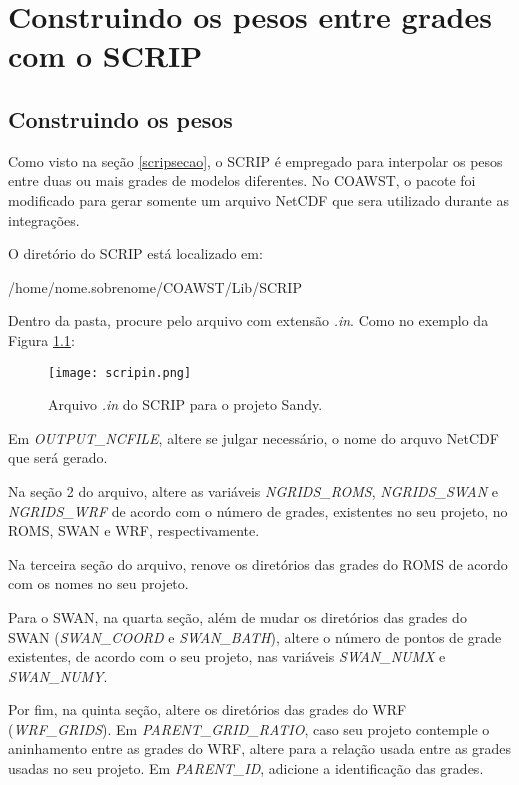 \chapter{Construindo os pesos entre grades com o SCRIP}

\section{Construindo os pesos}
\noindent Como visto na seção \textcolor{bleu_cite}{\ref{scripsecao}}, o SCRIP é empregado para interpolar os pesos entre duas ou mais grades de modelos diferentes. No COAWST, o pacote foi modificado para gerar somente um arquivo NetCDF que sera utilizado durante as integrações.
\bigskip

\noindent O diretório do SCRIP está localizado em:
\bigskip

\begin{bashcode}
/home/nome.sobrenome/COAWST/Lib/SCRIP
\end{bashcode}
\bigskip

\noindent Dentro da pasta, procure pelo arquivo com extensão \textit{.in}. Como no exemplo da Figura \textcolor{bleu_cite}{\ref{scripinnedit}}:

\begin{figure}[H]
    \centering
    \texttt{[image: scripin.png]}
    \caption{Arquivo \textit{.in} do SCRIP para o projeto Sandy.}
    \label{scripinnedit}
\end{figure}
\bigskip

\noindent Em \textit{OUTPUT\_NCFILE}, altere se julgar necessário, o nome do arquvo NetCDF que será gerado.
\bigskip

\noindent Na seção 2 do arquivo, altere as variáveis \textit{NGRIDS\_ROMS}, \textit{NGRIDS\_SWAN} e \textit{NGRIDS\_WRF} de acordo com o número de grades, existentes no seu projeto, no ROMS, SWAN e WRF, respectivamente.
\bigskip

\noindent Na terceira seção do arquivo, renove os diretórios das grades do ROMS de acordo com os nomes no seu projeto.
\bigskip

\noindent Para o SWAN, na quarta seção, além de mudar os diretórios das grades do SWAN (\textit{SWAN\_COORD} e \textit{SWAN\_BATH}), altere o número de pontos de grade existentes, de acordo com o seu projeto, nas variáveis \textit{SWAN\_NUMX} e \textit{SWAN\_NUMY}.
\bigskip

\noindent Por fim, na quinta seção, altere os diretórios das grades do WRF (\textit{WRF\_GRIDS}). Em \textit{PARENT\_GRID\_RATIO}, caso seu projeto contemple o aninhamento entre as grades do WRF, altere para a relação usada entre as grades usadas no seu projeto. Em \textit{PARENT\_ID}, adicione a identificação das grades.
\bigskip

